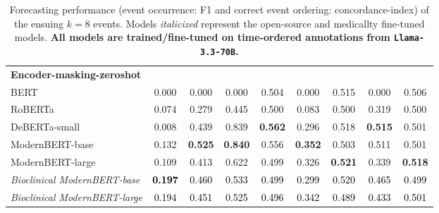 \begin{table}[!htbp]
{\begin{tabular}{lcccccccc}
\midrule
\textbf{Encoder-masking-zeroshot} &&&&&&&&\\
BERT & 0.000 & 0.000 & 0.000 & 0.504 & 0.000 & 0.515 & 0.000 & 0.506 \\
RoBERTa & 0.074 & 0.279 & 0.445 & 0.500 & 0.083 & 0.500 & 0.319 & 0.500 \\
DeBERTa-small & 0.008 & 0.439 & 0.839 & \textbf{0.562} & 0.296 & 0.518 & \textbf{0.515} & 0.501 \\
ModernBERT-base & 0.132 & \textbf{0.525} & \textbf{0.840} & 0.556 & \textbf{0.352} & 0.503 & 0.511 & 0.501 \\
ModernBERT-large & 0.109 & 0.413 & 0.622 & 0.499 & 0.326 & \textbf{0.521} & 0.339 & \textbf{0.518} \\
\textit{Bioclinical ModernBERT-base} & \textcolor{black}{\textbf{0.197}} & \textcolor{black}{0.460} & \textcolor{black}{0.533} & \textcolor{black}{0.499} & \textcolor{black}{0.299} & \textcolor{black}{0.520} & \textcolor{black}{0.465} & \textcolor{black}{0.499} \\
\textit{Bioclinical ModernBERT-large} & \textcolor{black}{0.194} & \textcolor{black}{0.451} & \textcolor{black}{0.525} & \textcolor{black}{0.496} & \textcolor{black}{0.342} & \textcolor{black}{0.489} & \textcolor{black}{0.433} & \textcolor{black}{0.501} \\
\bottomrule
\end{tabular}
}
\caption{Forecasting performance (event occurrence: F1 and correct event ordering: concordance-index) of the ensuing $k=8$ events. Models \emph{italicized} represent the open-source and medicallty fine-tuned models. \textbf{All models are trained/fine-tuned on time-ordered annotations from \texttt{Llama-3.3-70B}.}}
\label{tab:L33_forecasting}
\end{table}

